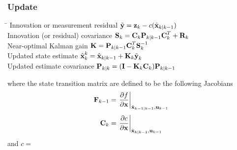 \subsubsection*{Update}
\begin{tabbing}
\hspace{8cm}\=\kill
Innovation or measurement residual\> $\tilde{\textbf{y}}= \textbf{z}_k-c(\hat{\textbf{x}}_{k|k-1})$\\
Innovation (or residual) covariance\> $\textbf{S}_k=\textbf{C}_k\textbf{P}_{k|k-1}\textbf{C}^T_k+\textbf{R}_k$\\
Near-optimal Kalman gain\> $\textbf{K}=\textbf{P}_{k|k-1}\textbf{C}^T_k\textbf{S}^{-1}_k$\\
Updated state estimate\> $\hat{\textbf{x}}_k^k=\hat{\textbf{x}}_{k|k-1}+\textbf{K}_k\tilde{\textbf{y}}_k$\\
Updated estimate covariance\> $\textbf{P}_{k|k}=(\textbf{I}-\textbf{K}_k\textbf{C}_k)\textbf{P}_{k|k-1}$
\end{tabbing}
where the state transition matrix are defined to be the following Jacobians
\begin{equation*}
	\textbf{F}_{k-1}=\left. \frac{\partial f}{\partial \textbf{x}}\right|_{{\hat{\textbf{x}}_{k-1|k-1},			\textbf{u}_{k-1}}}
\end{equation*}
\begin{equation*}
	\textbf{C}_{k}=\left. \frac{\partial c}{\partial \textbf{x}}\right|_{{\hat{\textbf{x}}_{k|k-1},			\textbf{u}_{k-1}}}
\end{equation*}
and $c = $